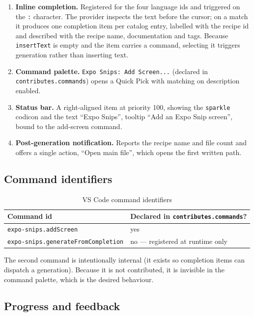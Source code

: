\begin{enumerate}
  \item \textbf{Inline completion.} Registered for the four language ids and
        triggered on the \texttt{:} character. The provider inspects the text before
        the cursor; on a match it produces one completion item per catalog entry,
        labelled with the recipe id and described with the recipe name,
        documentation and tags. Because \texttt{insertText} is empty and the item
        carries a command, selecting it triggers generation rather than inserting
        text.
  \item \textbf{Command palette.} \texttt{Expo Snips: Add Screen...} (declared in
        \texttt{contributes.commands}) opens a Quick Pick with matching on
        description enabled.
  \item \textbf{Status bar.} A right-aligned item at priority 100, showing the
        \texttt{sparkle} codicon and the text ``Expo Snips'', tooltip ``Add an Expo
        Snip screen'', bound to the add-screen command.
  \item \textbf{Post-generation notification.} Reports the recipe name and file
        count and offers a single action, ``Open main file'', which opens the first
        written path.
\end{enumerate}

\subsection*{Command identifiers}

\begin{table}[H]
\centering
\caption{VS Code command identifiers}
\begin{tabular}{@{}L{6cm}L{7.6cm}@{}}
\toprule
\textbf{Command id} & \textbf{Declared in \texttt{contributes.commands}?} \\
\midrule
\texttt{expo-snips.addScreen} & yes \\
\texttt{expo-snips.generateFromCompletion} & no --- registered at runtime only \\
\bottomrule
\end{tabular}
\end{table}

The second command is intentionally internal (it exists so completion items can
dispatch a generation). Because it is not contributed, it is invisible in the
command palette, which is the desired behaviour.

\subsection*{Progress and feedback}


